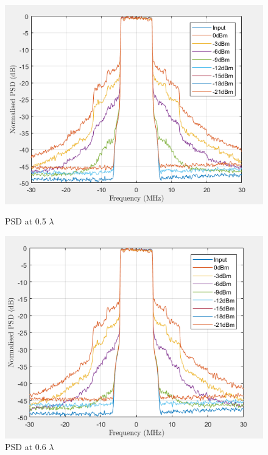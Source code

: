 \begin{figure}[H]
  \centering
  \begin{minipage}[b]{0.5\textwidth}
	\includegraphics[scale = 0.5]{figures/measurement/two_antenna/psd_05.png}
	\caption{PSD at 0.5 $\lambda$}
    \label{fig:psd05}
  \end{minipage}
  \hfill
  \begin{minipage}[b]{0.4\textwidth}
\includegraphics[scale = 0.5]{figures/measurement/two_antenna/psd_06.png}
\caption{PSD at 0.6 $\lambda$}
    \label{fig:psd06}
  \end{minipage}
\end{figure}

